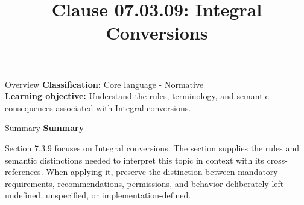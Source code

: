 \documentclass[10pt,letterpaper]{article}
\title{Clause 07.03.09: Integral Conversions}
\author{}
\date{}
\begin{document}
\maketitle
\begin{CornellOverviewBox}{Overview}
\textbf{Classification:} Core language - Normative\\[2pt]
\textbf{Learning objective:} Understand the rules, terminology, and semantic consequences associated with Integral conversions.
\end{CornellOverviewBox}\begin{CornellSummaryBox}{Summary}
{\sffamily\bfseries\color{Accent} Summary}\par\vspace{3pt}Section 7.3.9 focuses on Integral conversions. The section supplies the rules and semantic distinctions needed to interpret this topic in context with its cross-references. When applying it, preserve the distinction between mandatory requirements, recommendations, permissions, and behavior deliberately left undefined, unspecified, or implementation-defined.
\end{CornellSummaryBox}
\end{document}
